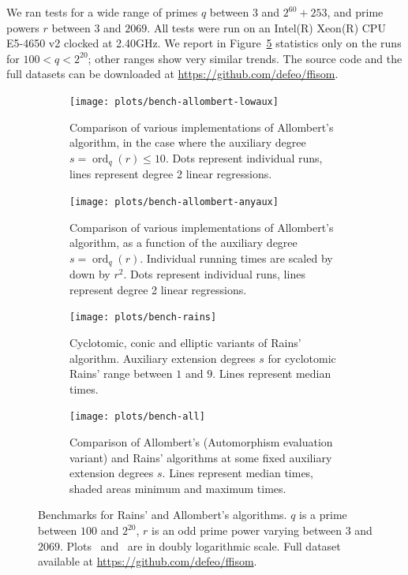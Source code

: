 \documentclass{mcom-l}
\theoremstyle{plain}
\theoremstyle{definition}
\DeclareMathOperator{\order}{ord} %
\newcounter{algorithm}
\begin{document}
We ran tests for a wide range of primes $q$ between $3$ and
$2^{60}+253$, and prime powers $r$ between $3$ and $2069$. All tests
were run on an
Intel(R) Xeon(R) CPU E5-4650 v2 clocked at 2.40GHz.
We report in Figure~\ref{fig:bench} statistics only on the runs for
$100<q<2^{20}$; other ranges show very similar trends. The source
code and the full datasets can be downloaded at
\url{https://github.com/defeo/ffisom}.

\begin{figure}
  \newlength{\mywidth}
  \setlength{\mywidth}{6cm}
  \centering

  \begin{subfigure}{.48\textwidth}
    \texttt{[image: plots/bench-allombert-lowaux]}
    \caption{Comparison of various implementations of Allombert's
      algorithm, in the case where the auxiliary degree
      $s=\order_q(r)\le 10$.  Dots represent individual runs, lines
      represent degree 2 linear regressions.}
    \label{fig:bench:allombert-lowaux}
  \end{subfigure}
  \hfill
  \begin{subfigure}{.48\textwidth}
    \noindent
    \texttt{[image: plots/bench-allombert-anyaux]}
    \caption{Comparison of various implementations of Allombert's
      algorithm, as a function of the auxiliary degree
      $s=\order_q(r)$.  Individual running times are scaled by down by
      $r^2$.  Dots represent individual runs, lines represent degree 2
      linear regressions.}
    \label{fig:bench:allombert-anyaux}
  \end{subfigure}

  \begin{subfigure}{.48\textwidth}
    \noindent
    \texttt{[image: plots/bench-rains]}
    \caption{Cyclotomic, conic and elliptic variants of Rains'
      algorithm.  Auxiliary extension degrees $s$ for cyclotomic
      Rains' range between $1$ and $9$. Lines represent median times.}
    \label{fig:bench:rains}
  \end{subfigure}
  \hfill
  \begin{subfigure}{.48\textwidth}
    \noindent
    \texttt{[image: plots/bench-all]}
    \caption{Comparison of Allombert's (Automorphism evaluation
      variant) and Rains' algorithms at some fixed auxiliary extension
      degrees $s$. Lines represent median times, shaded areas minimum
      and maximum times.}
    \label{fig:bench:all}
  \end{subfigure}

  \caption{Benchmarks for Rains' and Allombert's algorithms. $q$ is a
    prime between $100$ and $2^{20}$, $r$ is an odd prime power
    varying between $3$ and $2069$.  Plots~
    and~ are in doubly logarithmic scale. Full
    dataset available at \url{https://github.com/defeo/ffisom}.}
  \label{fig:bench}
\end{figure}
\end{document}
